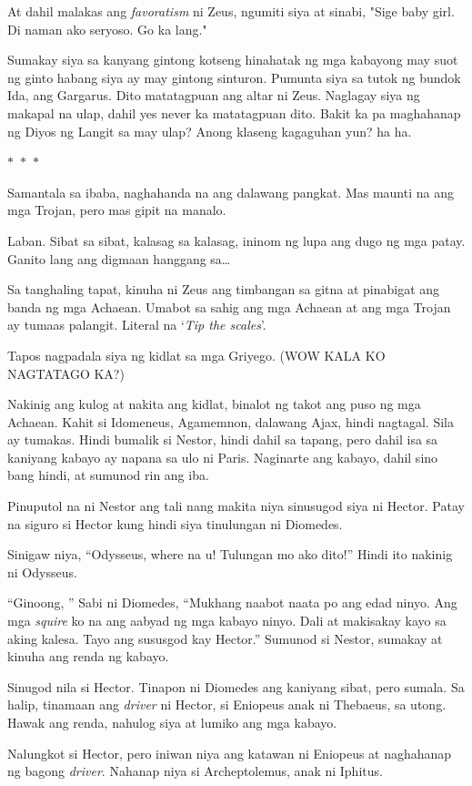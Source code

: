 \documentclass[12pt,letterpaper]{report}
\newcommand{\seperate}{\begin{center}$\ast$~$\ast$~$\ast$\end{center}}
\begin{document}
At dahil malakas ang \textit{favoratism} ni Zeus, ngumiti siya at sinabi, "Sige baby girl. Di naman ako seryoso. Go ka lang."

Sumakay siya sa kanyang gintong kotseng hinahatak ng mga kabayong may suot ng ginto habang siya ay may gintong sinturon. Pumunta siya sa tutok ng bundok Ida, ang Gargarus. Dito matatagpuan ang altar ni Zeus. Naglagay siya ng makapal na ulap, dahil yes never ka matatagpuan dito. Bakit ka pa maghahanap ng Diyos ng Langit sa may ulap? Anong klaseng kagaguhan yun? ha ha.

\seperate

Samantala sa ibaba, naghahanda na ang dalawang pangkat. Mas maunti na ang mga Trojan, pero mas gipit na manalo.

Laban. Sibat sa sibat, kalasag sa kalasag, ininom ng lupa ang dugo ng mga patay. Ganito lang ang digmaan hanggang sa\dots

Sa tanghaling tapat, kinuha ni Zeus ang timbangan sa gitna at pinabigat ang banda ng mga Achaean. Umabot sa sahig ang mga Achaean at ang mga Trojan ay tumaas palangit. Literal na `\textit{Tip the scales}'.

Tapos nagpadala siya ng kidlat sa mga Griyego. (WOW KALA KO NAGTATAGO KA?)

Nakinig ang kulog at nakita ang kidlat, binalot ng takot ang puso ng mga Achaean. Kahit si Idomeneus, Agamemnon, dalawang Ajax, hindi nagtagal. Sila ay tumakas. Hindi bumalik si Nestor, hindi dahil sa tapang, pero dahil isa sa kaniyang kabayo ay napana sa ulo ni Paris. Naginarte ang kabayo, dahil sino bang hindi, at sumunod rin ang iba.

Pinuputol na ni Nestor ang tali nang makita niya sinusugod siya ni Hector. Patay na siguro si Hector kung hindi siya tinulungan ni Diomedes.

Sinigaw niya, ``Odysseus, where na u! Tulungan mo ako dito!'' Hindi ito nakinig ni Odysseus.

``Ginoong, '' Sabi ni Diomedes, ``Mukhang naabot naata po ang edad ninyo. Ang mga \textit{squire} ko na ang aabyad ng mga kabayo ninyo. Dali at makisakay kayo sa aking kalesa. Tayo ang sususgod kay Hector.'' Sumunod si Nestor, sumakay at kinuha ang renda ng kabayo.

Sinugod nila si Hector. Tinapon ni Diomedes ang kaniyang sibat, pero sumala. Sa halip, tinamaan ang \textit{driver} ni Hector, si Eniopeus anak ni Thebaeus, sa utong. Hawak ang renda, nahulog siya at lumiko ang mga kabayo.

Nalungkot si Hector, pero iniwan niya ang katawan ni Eniopeus at naghahanap ng bagong \textit{driver}. Nahanap niya si Archeptolemus, anak ni Iphitus.
\end{document}
